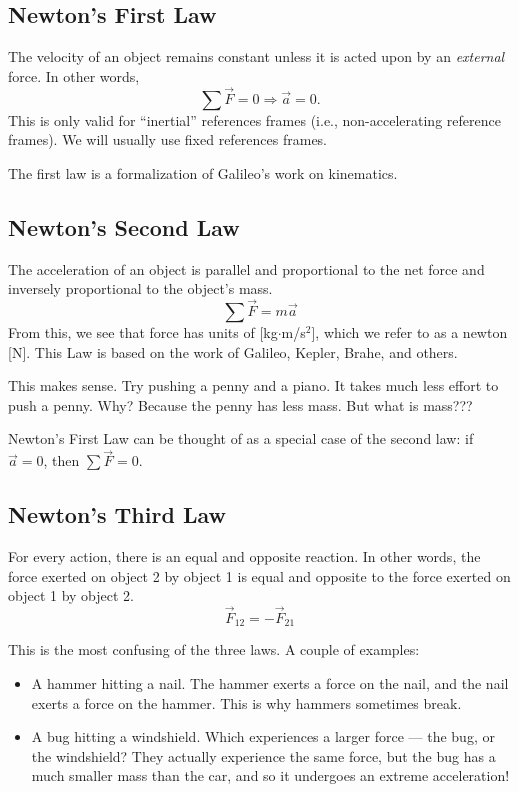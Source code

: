 \subsection{Newton's First Law}
The velocity of an object remains constant unless it is acted upon by an \textit{external} force. In other words,
$$\sum\vec{F}=0\Rightarrow \vec{a}=0.$$
This is only valid for ``inertial'' references frames (i.e., non-accelerating reference frames). We will usually use fixed references frames. 

The first law is a formalization of Galileo's work on kinematics.

\subsection{Newton's Second Law}
The acceleration of an object is parallel and proportional to the net force and inversely proportional to the object's mass.
$$\sum\vec{F}=m\vec{a}$$
From this, we see that force has units of [kg$\cdot$m/s$^2$], which we refer to as a newton [N]. This Law is based on the work of Galileo, Kepler, Brahe, and others.

This makes sense. Try pushing a penny and a piano. It takes much less effort to push a penny. Why? Because the penny has less mass. But what is mass???

Newton's First Law can be thought of as a special case of the second law: if $\vec{a}=0$, then $\sum \vec{F}=0$.

\subsection{Newton's Third Law}
For every action, there is an equal and opposite reaction. In other words, the force exerted on object 2 by object 1 is equal and opposite to the force exerted on object 1 by object 2.
$$\vec{F}_{12}=-\vec{F}_{21}$$

This is the most confusing of the three laws. A couple of examples:
\begin{itemize}
\item A hammer hitting a nail. The hammer exerts a force on the nail, and the nail exerts a force on the hammer. This is why hammers sometimes break.
\item A bug hitting a windshield. Which experiences a larger force --- the bug, or the windshield? They actually experience the same force, but the bug has a much smaller mass than the car, and so it undergoes an extreme acceleration!
\end{itemize}

